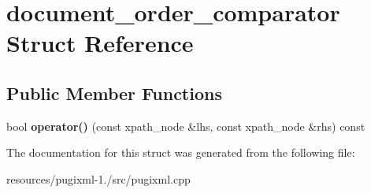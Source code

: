 \hypertarget{structdocument__order__comparator}{\section{document\+\_\+order\+\_\+comparator Struct Reference}
\label{structdocument__order__comparator}
}
\subsection*{Public Member Functions}
\begin{DoxyCompactItemize}
\item 
\hypertarget{structdocument__order__comparator_a11e471cbfa426bc9e48844c1db1a190e}{bool {\bfseries operator()} (const xpath\+\_\+node \&lhs, const xpath\+\_\+node \&rhs) const }\label{structdocument__order__comparator_a11e471cbfa426bc9e48844c1db1a190e}

\end{DoxyCompactItemize}


The documentation for this struct was generated from the following file\+:\begin{DoxyCompactItemize}
\item 
resources/pugixml-\/1./src/pugixml.\+cpp\end{DoxyCompactItemize}
